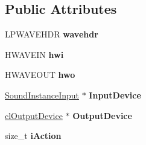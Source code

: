 \subsection*{Public Attributes}
\begin{DoxyCompactItemize}
\item 
\hypertarget{classcl_sound_thread_ac0c4b528c43c551bd46e7caf2f20bcf1}{
LPWAVEHDR {\bfseries wavehdr}}
\label{classcl_sound_thread_ac0c4b528c43c551bd46e7caf2f20bcf1}

\item 
\hypertarget{classcl_sound_thread_a8672193b94f6f32dd1b8f34d5c3bf6a0}{
HWAVEIN {\bfseries hwi}}
\label{classcl_sound_thread_a8672193b94f6f32dd1b8f34d5c3bf6a0}

\item 
\hypertarget{classcl_sound_thread_ad618c79010facbedaaa0817623f4e969}{
HWAVEOUT {\bfseries hwo}}
\label{classcl_sound_thread_ad618c79010facbedaaa0817623f4e969}

\item 
\hypertarget{classcl_sound_thread_a36701f5849acb54a7d93c0dd71dbb0d5}{
\hyperlink{class_sound_instance_input}{SoundInstanceInput} $\ast$ {\bfseries InputDevice}}
\label{classcl_sound_thread_a36701f5849acb54a7d93c0dd71dbb0d5}

\item 
\hypertarget{classcl_sound_thread_af4665c074d5dfc2689e8fd611bbb23f6}{
\hyperlink{classcl_output_device}{clOutputDevice} $\ast$ {\bfseries OutputDevice}}
\label{classcl_sound_thread_af4665c074d5dfc2689e8fd611bbb23f6}

\item 
\hypertarget{classcl_sound_thread_a79a46e6042cb9a8773c0dadf63372333}{
size\_\-t {\bfseries iAction}}
\label{classcl_sound_thread_a79a46e6042cb9a8773c0dadf63372333}

\end{DoxyCompactItemize}
